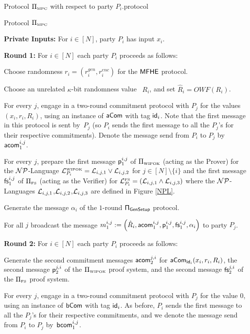 \begin{boxfig}{Protocol $\Pi_{\scriptscriptstyle\mathrm{MPC}}$ with respect to party $P_i$.\label{fig:MPC}}{protocol}

\centerline{Protocol $\Pi_{\scriptscriptstyle\mathrm{MPC}}$}
{\bf Private Inputs:} For $i \in [N]$, party $P_i$ has input $x_i$.

{\bf Round 1:} For $i\in[N]$ each party $P_i$ proceeds as follows: 
\BE
\item
  Choose randomness $r_i=(r^{gen}_i,r^{enc}_i)$ for the ${\mathsf{MFHE}}$ protocol.

\item Choose an unrelated $\kappa$-bit randomness value ~$R_i$, and set $\hat{R}_i=OWF(R_i)$.

\item For every $j$, engage in a two-round commitment protocol with $P_j$ for the values $(x_i,r_i,R_i)$, using an instance of $\mathsf{aCom}$ with tag $\mathsf{id}_i$. Note that the first message in this protocol is sent by~$P_j$ (so $P_i$ sends the first message to all the $P_j$'s for their respective commitments). Denote the message send from $P_i$ to $P_j$ by~$\mathsf{acom}_1^{i,j}$.

\item For every $j$, prepare the first message $\mathsf{p}^{i,j}_1$ of $\Pi_{\scriptscriptstyle\mathrm{WIPOK}}$ (acting as the Prover) for the ${{\cal NP}}$-Language ${{\cal L}^{\scriptscriptstyle\mathrm{WIPOK}}_{P_i}}={{\cal L}_{i,j,1}}\lor{{\cal L}_{i,j,2}}$ for ${j\in[N]\setminus{\{i\}}}$ and the first message $\mathsf{fs}^{i,j}_1$ of $\Pi_{\scriptscriptstyle\mathrm{FS}}$ (acting as the Verifier) for ${{{\mathsf{{\cal L}}}^{{\scriptscriptstyle\mathrm{FS}}}_{P_i}}}=({{\cal L}_{i,j,1}}\land {{\cal L}_{i,j,3}})$ where the ${{\cal NP}}$-Languages ${{\cal L}_{i,j,1}}$,${{\cal L}_{i,j,2}}$,${{\cal L}_{i,j,3}}$ are defined in Figure \ref{NPL}.


\item Generate the message $\alpha_i$ of the $1$-round $\sf \Pi_{GenSetup}$ protocol.

\item For all $j$ broadcast the message $m^{i,j}_1:=\left(\hat{R}_i, \mathsf{acom}_1^{i,j}, \mathsf{p}_1^{i,j},\mathsf{fs}_1^{i,j},\alpha_i\right)$ to party $P_j$.%
\EE

{\bf Round 2:} For $i\in[N]$ each party $P_i$ proceeds as follows: 
\BE 
\item Generate the second commitment messages $\mathsf{acom}_2^{j,i}$ for $\mathsf{aCom}_{\mathsf{id}_i}(x_i, r_i,R_i)$, the second message $\mathsf{p}_2^{j,i}$ of the $\Pi_{\scriptscriptstyle\mathrm{WIPOK}}$ proof system, and the second message $\mathsf{fs}_2^{j,i}$ of the $\Pi_{\scriptscriptstyle\mathrm{FS}}$ proof system.

\item For every $j$, engage in a two-round commitment protocol with $P_j$ for the value $0$, using an instance of $\mathsf{bCom}$ with tag $\mathsf{id}_i$. As before, $P_i$ sends the first message to all the $P_j$'s for their respective commitments, and we denote the message send from $P_i$ to $P_j$ by~${\mathsf{bcom}}_1^{i,j}$.


\end{boxfig}
